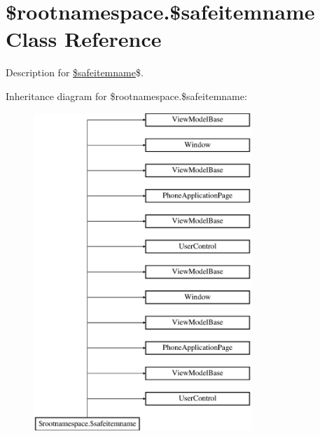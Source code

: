 \hypertarget{class_0Brootnamespace_1_1_0Bsafeitemname}{\section{\$rootnamespace.\$safeitemname Class Reference}
\label{class_0Brootnamespace_1_1_0Bsafeitemname}
}


Description for \hyperlink{class_0Brootnamespace_1_1_0Bsafeitemname}{\$safeitemname}\$.  


Inheritance diagram for \$rootnamespace.\$safeitemname\-:\begin{figure}[H]
\begin{center}
\leavevmode
\includegraphics[height=12.000000cm]{class_0Brootnamespace_1_1_0Bsafeitemname}
\end{center}
\end{figure}
